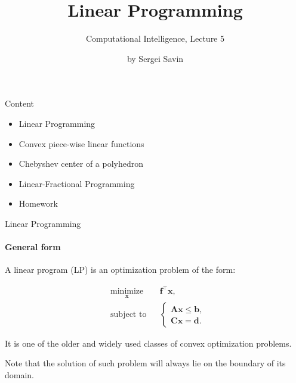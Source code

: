 \documentclass{beamer}
\title{Linear Programming}
\subtitle{Computational Intelligence, Lecture 5}
\author{by Sergei Savin}
\date{\mydate}
\begin{document}
\maketitle


\begin{frame}{Content}

\begin{itemize}
\item Linear Programming
\item Convex piece-wise linear functions
\item Chebyshev center of a polyhedron
\item Linear-Fractional Programming
\item Homework
\end{itemize}

\end{frame}



\begin{frame}{Linear Programming}
\framesubtitle{General form}
\begin{flushleft}

A linear program (LP) is an optimization problem of the form:

\begin{equation} \label{LP}
\begin{aligned}
& \underset{\mathbf{x}}{\text{minimize}}
& & \mathbf{f}^\top \mathbf{x} , \\
& \text{subject to}
& & \begin{cases} 
\mathbf{A}\mathbf{x} \leq \mathbf{b}, \\
\mathbf{C}\mathbf{x} = \mathbf{d}.
\end{cases}
%
\end{aligned}
\end{equation}

It is one of the older and widely used classes of convex optimization problems. 

\bigskip

Note that the solution of such problem will always lie on the boundary of its domain.
 
\end{flushleft}
\end{frame}
\end{document}
